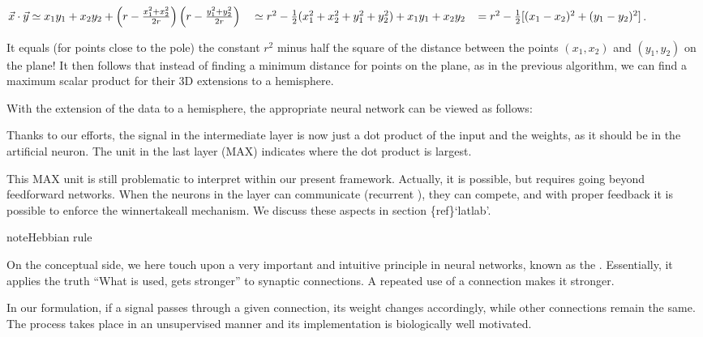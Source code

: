 \documentclass[letterpaper,10pt,english]{jupyterBook}
\begin{document}
\sphinxAtStartPar
\(\vec{x} \cdot \vec{y} \simeq x_1 y_1 + x_2 y_2 + \left( r -\frac{x_1^2+x_2^2}{2r} \right) \left( r -\frac{y_1^2+y_2^2}{2r} \right) \\ 
\;\;\;\simeq r^2 - \frac{1}{2} (x_1^2+x_2^2 +y_1^2+y_2^2) + x_1 y_1+x_2 y_2 \\ 
\;\;\; = r^2 - \frac{1}{2}[ (x_1-x_2)^2 +(y_1-y_2)^2]\).

\sphinxAtStartPar
It equals (for points close to the pole) the constant \( r ^ 2 \) minus half the square of the distance between the points \( (x_1, x_2) \) and \( (y_1, y_2) \) on the plane! It then follows that instead of finding a minimum distance for points on the plane, as in the previous algorithm, we can find a maximum scalar product for their 3D extensions to a hemisphere.

\sphinxAtStartPar
With the extension of the data to a hemisphere, the appropriate neural network can be viewed as follows:

\noindent{}

\sphinxAtStartPar
Thanks to our efforts, the signal in the intermediate layer is now just a dot product of the input and the weights, as it should be in the artificial neuron. The unit in the last layer (MAX) indicates where the dot product is largest.

\sphinxAtStartPar
This MAX unit is still problematic to interpret within our present framework. Actually, it is possible, but requires going beyond feed\sphinxhyphen{}forward networks. When the neurons in the layer can communicate (recurrent ), they can compete, and with proper feed\sphinxhyphen{}back it is possible to enforce the winner\sphinxhyphen{}take\sphinxhyphen{}all mechanism. We discuss these aspects in section \{ref\}`lat\sphinxhyphen{}lab’.

\begin{sphinxadmonition}{note}{Hebbian rule}

\sphinxAtStartPar
On the conceptual side, we here touch upon a very important and intuitive principle in neural networks, known as the . Essentially, it applies the truth “What is used, gets stronger” to synaptic connections. A repeated use of a connection makes it stronger.
\end{sphinxadmonition}

\sphinxAtStartPar
In our formulation, if a signal passes through a given connection, its weight changes accordingly, while other connections remain the same. The process takes place in an unsupervised manner and its implementation is biologically well motivated.
\end{document}
